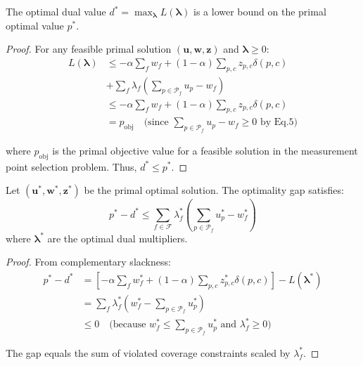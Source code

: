 
\begin{theorem}
The optimal dual value \(d^* = \max_{\boldsymbol{\lambda}} L(\boldsymbol{\lambda})\) is a lower bound on the primal optimal value \(p^*\).
\end{theorem}

\begin{proof}
For any feasible primal solution \((\mathbf{u},\mathbf{w},\mathbf{z})\) and \(\boldsymbol{\lambda} \geq 0\):
{\footnotesize
\[
\begin{aligned}
L(\boldsymbol{\lambda}) &\leq -\alpha \sum_f w_f + (1-\alpha) \sum_{p,c} z_{p,c} \delta(p,c) \\
&+ \sum_f \lambda_f \left( \sum_{p \in \mathcal{P}_f} u_p - w_f \right) \\
&\leq -\alpha \sum_f w_f + (1-\alpha) \sum_{p,c} z_{p,c} \delta(p,c) \\
&= p_{\text{obj}} \quad \text{(since } \sum_{p \in \mathcal{P}_f} u_p - w_f \geq 0 \text{ by Eq.5)}
\end{aligned}
\]
}

\noindent where $p_{\text{obj}}$ is the primal objective value for a feasible solution in the measurement point selection problem. Thus, \(d^* \leq p^*\).
\end{proof}

\begin{theorem}
Let \((\mathbf{u}^*,\mathbf{w}^*,\mathbf{z}^*)\) be the primal optimal solution. The optimality gap satisfies:
{\footnotesize
\[
p^* - d^* \leq \sum_{f \in \mathcal{F}} \lambda_f^* \left( \sum_{p \in \mathcal{P}_f} u_p^* - w_f^* \right)
\]}
where \(\boldsymbol{\lambda}^*\) are the optimal dual multipliers.
\end{theorem}

\begin{proof}
From complementary slackness:
{\footnotesize
\[
\begin{aligned}
p^* - d^* &= \left[ -\alpha \sum_f w_f^* + (1-\alpha) \sum_{p,c} z_{p,c}^* \delta(p,c) \right] - L(\boldsymbol{\lambda}^*) \\
&= \sum_f \lambda_f^* \left( w_f^* - \sum_{p \in \mathcal{P}_f} u_p^* \right) \\
&\leq 0 \quad \text{(because } w_f^* \leq \sum_{p \in \mathcal{P}_f} u_p^* \text{ and } \lambda_f^* \geq 0\text{)}
\end{aligned}
\]
}

\noindent The gap equals the sum of violated coverage constraints scaled by \(\lambda_f^*\).
\end{proof}

